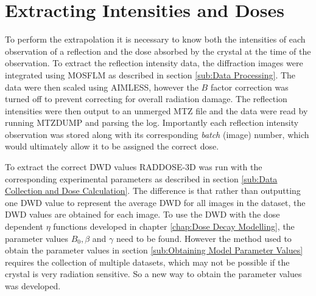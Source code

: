 \section{Extracting Intensities and Doses}
\label{sec:Extracting Intensities and Doses}
To perform the extrapolation it is necessary to know both the intensities of each observation of a reflection and the dose absorbed by the crystal at the time of the observation.
To extract the reflection intensity data, the diffraction images were integrated using MOSFLM as described in section \ref{sub:Data Processing}.
The data were then scaled using AIMLESS, however the $B$ factor correction was turned off to prevent correcting for overall radiation damage.
The reflection intensities were then output to an unmerged MTZ file and the data were read by running MTZDUMP and parsing the log.
Importantly each reflection intensity observation was stored along with its corresponding \textit{batch} (image) number, which would ultimately allow it to be assigned the correct dose.

To extract the correct DWD values RADDOSE-3D was run with the corresponding experimental parameters as described in section \ref{sub:Data Collection and Dose Calculation}.
The difference is that rather than outputting one DWD value to represent the average DWD for all images in the dataset, the DWD values are obtained for each image.
To use the DWD with the dose dependent $\eta$ functions developed in chapter \ref{chap:Dose Decay Modelling}, the parameter values $B_0, \beta$ and $\gamma$ need to be found.
However the method used to obtain the parameter values in section \ref{sub:Obtaining Model Parameter Values} requires the collection of multiple datasets, which may not be possible if the crystal is very radiation sensitive.
So a new way to obtain the parameter values was developed.

